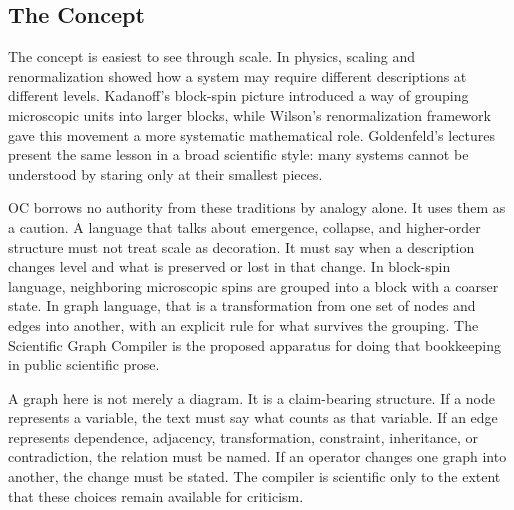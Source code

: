 \documentclass[11pt,a4paper,openany]{book}
\begin{document}
\subsection{The Concept}
The concept is easiest to see through scale. In physics, scaling and renormalization showed how a system may require different descriptions at different levels. Kadanoff's block-spin picture introduced a way of grouping microscopic units into larger blocks, while Wilson's renormalization framework gave this movement a more systematic mathematical role. Goldenfeld's lectures present the same lesson in a broad scientific style: many systems cannot be understood by staring only at their smallest pieces. \cite{grimmett_percolation,goldenfeld_lectures}\par
OC borrows no authority from these traditions by analogy alone. It uses them as a caution. A language that talks about emergence, collapse, and higher-order structure must not treat scale as decoration. It must say when a description changes level and what is preserved or lost in that change. In block-spin language, neighboring microscopic spins are grouped into a block with a coarser state. In graph language, that is a transformation from one set of nodes and edges into another, with an explicit rule for what survives the grouping. The Scientific Graph Compiler is the proposed apparatus for doing that bookkeeping in public scientific prose.\par
A graph here is not merely a diagram. It is a claim-bearing structure. If a node represents a variable, the text must say what counts as that variable. If an edge represents dependence, adjacency, transformation, constraint, inheritance, or contradiction, the relation must be named. If an operator changes one graph into another, the change must be stated. The compiler is scientific only to the extent that these choices remain available for criticism.\par
\end{document}
